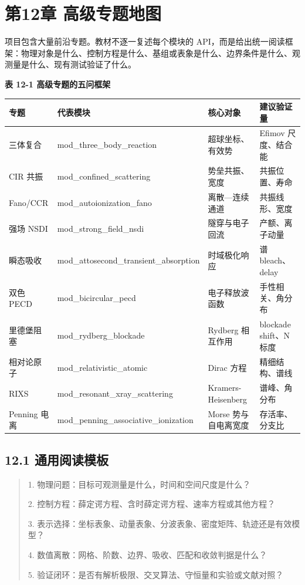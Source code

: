 \documentclass[UTF8,openany,11pt,fontset=fandol]{ctexbook}
\begin{document}
\chapter{第12章 高级专题地图}\label{ux7b2c12ux7ae0-ux9ad8ux7ea7ux4e13ux9898ux5730ux56fe}

项目包含大量前沿专题。教材不逐一复述每个模块的
API，而是给出统一阅读框架：物理对象是什么、控制方程是什么、基组或表象是什么、边界条件是什么、观测量是什么、现有测试验证了什么。

\textbf{表 12-1 高级专题的五问框架}

\begin{longtable}[]{@{}llll@{}}
\toprule
\textbf{专题} & \textbf{代表模块} & \textbf{核心对象} &
\textbf{建议验证量}\tabularnewline
\midrule
\endhead
三体复合 & mod\_three\_body\_reaction & 超球坐标、有效势 & Efimov
尺度、结合能\tabularnewline
CIR 共振 & mod\_confined\_scattering & 势垒共振、宽度 &
共振位置、寿命\tabularnewline
Fano/CCR & mod\_autoionization\_fano & 离散---连续通道 &
共振线形、宽度\tabularnewline
强场 NSDI & mod\_strong\_field\_nsdi & 隧穿与电子回流 &
产额、离子动量\tabularnewline
瞬态吸收 & mod\_attosecond\_transient\_absorption & 时域极化响应 & 谱
bleach、delay\tabularnewline
双色 PECD & mod\_bicircular\_pecd & 电子释放波函数 &
手性相关、角分布\tabularnewline
里德堡阻塞 & mod\_rydberg\_blockade & Rydberg 相互作用 & blockade
shift、N 标度\tabularnewline
相对论原子 & mod\_relativistic\_atomic & Dirac 方程 &
精细结构、谱线\tabularnewline
RIXS & mod\_resonant\_xray\_scattering & Kramers-Heisenberg &
谱峰、角分布\tabularnewline
Penning 电离 & mod\_penning\_associative\_ionization & Morse
势与自电离宽度 & 存活率、分支比\tabularnewline
\bottomrule
\end{longtable}

\section{\texorpdfstring{\textbf{12.1
通用阅读模板}}{12.1 通用阅读模板}}\label{ux901aux7528ux9605ux8bfbux6a21ux677f}

\begin{quote}
1. 物理问题：目标可观测量是什么，时间和空间尺度是什么？

2. 控制方程：薛定谔方程、含时薛定谔方程、速率方程或其他方程？

3. 表示选择：坐标表象、动量表象、分波表象、密度矩阵、轨迹还是有效模型？

4. 数值离散：网格、阶数、边界、吸收、匹配和收敛判据是什么？

5. 验证闭环：是否有解析极限、交叉算法、守恒量和实验或文献对照？
\end{quote}
\end{document}
